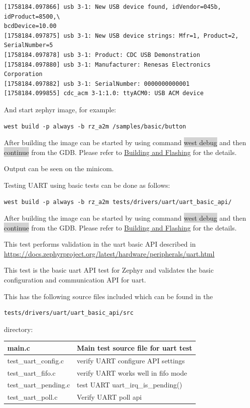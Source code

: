 \documentclass[11pt,a4paper,oneside]{article}
\begin{document}
\begin{lstlisting}
[1758184.097866] usb 3-1: New USB device found, idVendor=045b, idProduct=8500,\
bcdDevice=10.00
[1758184.097875] usb 3-1: New USB device strings: Mfr=1, Product=2, SerialNumber=5
[1758184.097878] usb 3-1: Product: CDC USB Demonstration
[1758184.097880] usb 3-1: Manufacturer: Renesas Electronics Corporation
[1758184.097882] usb 3-1: SerialNumber: 0000000000001
[1758184.099855] cdc_acm 3-1:1.0: ttyACM0: USB ACM device
\end{lstlisting}

And start zephyr image, for example:

\begin{lstlisting}
west build -p always -b rz_a2m /samples/basic/button
\end{lstlisting}

After building the image can be started by using command \colorbox{lightgray}{west debug}
and then \colorbox{lightgray}{continue} from the GDB. Please refer to
\hyperref[building-and-flashing]{Building and Flashing} for the
details.

Output can be seen on the minicom.

Testing UART using basic tests can be done as follows:

\begin{lstlisting}
west build -p always -b rz_a2m tests/drivers/uart/uart_basic_api/
\end{lstlisting}

After building the image can be started by using command \colorbox{lightgray}{west debug}
and then \colorbox{lightgray}{continue} from the GDB. Please refer to
\hyperref[building-and-flashing]{Building and Flashing} for the
details.

This test performs validation in the uart basic API described in
\url{https://docs.zephyrproject.org/latest/hardware/peripherals/uart.html}

This test is the basic uart API test for Zephyr and validates the basic
configuration and communication API for uart.

This has the following source files included which can be found in the
\begin{lstlisting}
tests/drivers/uart/uart_basic_api/src
\end{lstlisting}
directory:

\begin{tabular}{|l|l|}
  \hline
  main.c & Main test source file for uart test \\
  \hline
  test\_uart\_config.c & verify UART configure API settings \\
  \hline
  test\_uart\_fifo.c & verify UART works well in fifo mode \\
  \hline
  test\_uart\_pending.c & test UART uart\_irq\_is\_pending() \\
  \hline
  test\_uart\_poll.c & Verify UART poll api \\
  \hline
\end{tabular}
\end{document}
